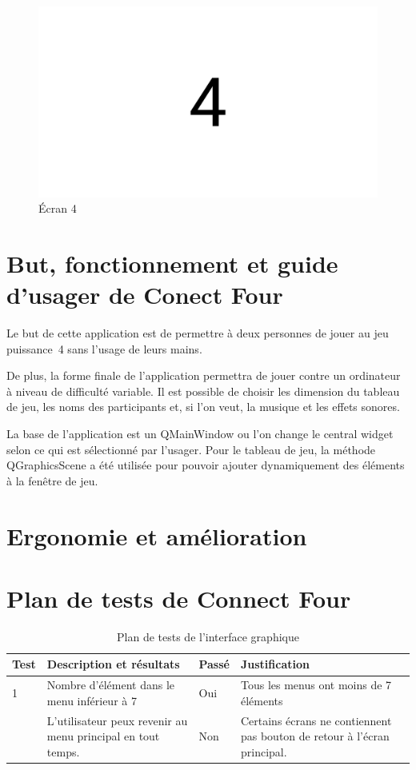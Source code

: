 \begin{figure}[H]
    \centering
    \includegraphics[width=6in]{img/4}
    \caption{Écran 4}
\end{figure}

\section{But, fonctionnement et guide d'usager de Conect Four}

Le but de cette application est de permettre à deux personnes de jouer au jeu puissance~4 sans l’usage de leurs mains.

De plus, la forme finale de l’application permettra de jouer contre un ordinateur à niveau de difficulté variable.
Il est possible de choisir les dimension du tableau de jeu, les noms des participants et, si l’on veut, la musique et les effets sonores.

La base de l’application est un QMainWindow ou l’on change le central widget selon ce qui est sélectionné par l’usager.
Pour le tableau de jeu, la méthode QGraphicsScene a été utilisée pour pouvoir ajouter dynamiquement des éléments à la fenêtre de jeu.

\section{Ergonomie et amélioration}

\section{Plan de tests de Connect Four}

\begin{table}[H]
    \centering
    \caption{Plan de tests de l'interface graphique}
    \begin{tabular}{p{0.25in}p{2.5in}p{0.5in}p{2.5in}}
        \hline
        \bfseries Test & \bfseries Description et résultats & \bfseries Passé & \bfseries Justification \\
        \hline\hline
        1 & Nombre d'élément dans le menu inférieur à 7 & Oui & Tous les menus ont moins de 7 éléments \\
        & L'utilisateur peux revenir au menu principal en tout temps. & Non & Certains écrans ne contiennent pas bouton de retour à l'écran principal.\\
        \hline
    \end{tabular}
\end{table}

